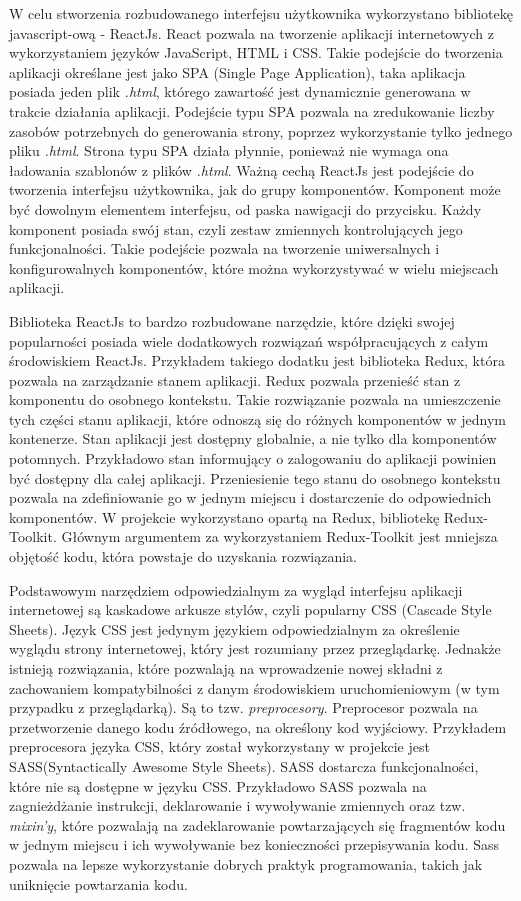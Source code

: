 \documentclass[a4paper,12pt]{book}
\begin{document}
W celu stworzenia rozbudowanego interfejsu użytkownika wykorzystano bibliotekę javascript-ową - ReactJs. React pozwala na tworzenie aplikacji internetowych z wykorzystaniem języków JavaScript, HTML i CSS. Takie podejście do tworzenia aplikacji określane jest jako SPA (Single Page Application), taka aplikacja posiada jeden plik \textit{.html}, którego zawartość jest dynamicznie generowana w trakcie działania aplikacji. Podejście typu SPA pozwala na zredukowanie liczby zasobów potrzebnych do generowania strony, poprzez wykorzystanie tylko jednego pliku \textit{.html}. Strona typu SPA działa płynnie, ponieważ nie wymaga ona ładowania szablonów z plików \textit{.html}. Ważną cechą ReactJs jest podejście do tworzenia interfejsu użytkownika, jak do grupy komponentów. Komponent może być dowolnym elementem interfejsu, od paska nawigacji do przycisku. Każdy komponent posiada swój stan, czyli zestaw zmiennych kontrolujących jego funkcjonalności. Takie podejście pozwala na tworzenie uniwersalnych i konfigurowalnych komponentów, które można wykorzystywać w wielu miejscach aplikacji.

Biblioteka ReactJs to bardzo rozbudowane narzędzie, które dzięki swojej popularności posiada wiele dodatkowych rozwiązań współpracujących z całym środowiskiem ReactJs. Przykładem takiego dodatku jest biblioteka Redux, która pozwala na zarządzanie stanem aplikacji. Redux pozwala przenieść stan z komponentu do osobnego kontekstu. Takie rozwiązanie pozwala na umieszczenie tych części stanu aplikacji, które odnoszą się do różnych komponentów w jednym kontenerze. Stan aplikacji jest dostępny globalnie, a nie tylko dla komponentów potomnych. Przykładowo stan informujący o zalogowaniu do aplikacji powinien być dostępny dla całej aplikacji. Przeniesienie tego stanu do osobnego kontekstu pozwala na zdefiniowanie go w jednym miejscu i dostarczenie do odpowiednich komponentów. W projekcie wykorzystano opartą na Redux, bibliotekę Redux-Toolkit. Głównym argumentem za wykorzystaniem Redux-Toolkit jest mniejsza objętość kodu, która powstaje do uzyskania rozwiązania.

Podstawowym narzędziem odpowiedzialnym za wygląd interfejsu aplikacji internetowej są kaskadowe arkusze stylów, czyli popularny CSS (Cascade Style Sheets). Język CSS jest jedynym językiem odpowiedzialnym za określenie wyglądu strony internetowej, który jest rozumiany przez przeglądarkę. Jednakże istnieją rozwiązania, które pozwalają na wprowadzenie nowej składni z zachowaniem kompatybilności z danym środowiskiem uruchomieniowym (w tym przypadku z przeglądarką). Są to tzw. \textit{preprocesory}. Preprocesor pozwala na przetworzenie danego kodu źródłowego, na określony kod wyjściowy. Przykładem preprocesora języka CSS, który został wykorzystany w projekcie jest SASS(Syntactically Awesome Style Sheets). SASS dostarcza funkcjonalności, które nie są dostępne w języku CSS. Przykładowo SASS pozwala na zagnieżdżanie instrukcji, deklarowanie i wywoływanie zmiennych oraz tzw. \textit{mixin'y}, które pozwalają na zadeklarowanie powtarzających się fragmentów kodu w jednym miejscu i ich wywoływanie bez konieczności przepisywania kodu. Sass pozwala na lepsze wykorzystanie dobrych praktyk programowania, takich jak uniknięcie powtarzania kodu.
\end{document}
